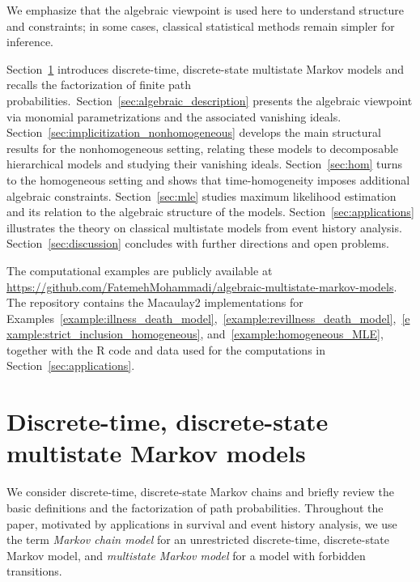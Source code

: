 \documentclass[11pt, a4paper]{article}
\numberwithin{equation}{section}
\theoremstyle{plain}
\theoremstyle{definition}
\renewcommand{\emph}[1]{\textit{#1}}
\begin{document}
We emphasize that the algebraic viewpoint is used here to understand structure and constraints;
in some cases, classical statistical methods remain simpler for inference.




\smallskip
{}
Section~\ref{sec:Preliminaries} introduces discrete-time, discrete-state multistate Markov models and recalls the
factorization of finite path probabilities.~Section~\ref{sec:algebraic_description} presents the
algebraic viewpoint via monomial parametrizations and the associated vanishing ideals.
Section~\ref{sec:implicitization_nonhomogeneous} develops the main structural results for the
nonhomogeneous setting, relating these models to decomposable hierarchical models and
studying their vanishing ideals. Section~\ref{sec:hom} turns to the homogeneous setting and
shows that time-homogeneity imposes additional algebraic constraints. Section~\ref{sec:mle}
studies maximum likelihood estimation and its relation to the algebraic structure of the models.
Section~\ref{sec:applications} illustrates the theory on classical multistate models from event
history analysis. Section~\ref{sec:discussion} concludes with further directions and open problems.


\medskip{}
The computational examples are publicly available at
\url{https://github.com/FatemehMohammadi/algebraic-multistate-markov-models}.
The repository contains the Macaulay2 implementations for Examples~\ref{example:illness_death_model},~\ref{example:revillness_death_model},~\ref{example:strict_inclusion_homogeneous}, and~\ref{example:homogeneous_MLE}, together with the R code and data used for the computations in Section~\ref{sec:applications}.

\section{Discrete-time, discrete-state multistate Markov models}\label{sec:Preliminaries}
We consider discrete-time, discrete-state Markov chains and briefly review the basic definitions and the factorization of path probabilities. Throughout the paper, motivated by applications in survival and event history analysis, we use the term \emph{Markov chain model} for an unrestricted discrete-time, discrete-state Markov model, and \emph{multistate Markov model} for a model with forbidden transitions.
\end{document}
